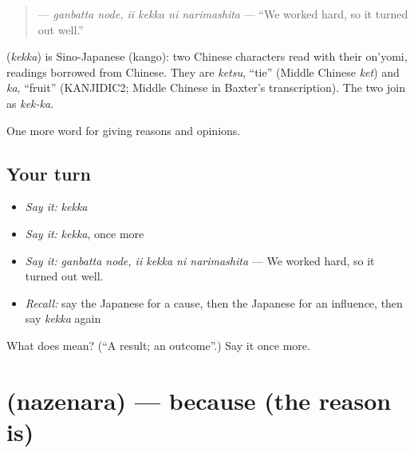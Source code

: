 \begin{quote}
\textbf{  } — \emph{ganbatta node, ii kekka ni narimashita} — \textquotedblleft{}We worked hard, so it turned out well.\textquotedblright{}
\end{quote}

\begin{cousinweb}
\textbf{} (\emph{kekka}) is Sino-Japanese (kango): two Chinese characters read with their on'yomi, readings borrowed from Chinese. They are \emph{ketsu}, \textquotedblleft{}tie\textquotedblright{} (Middle Chinese \emph{ket}) and \emph{ka}, \textquotedblleft{}fruit\textquotedblright{} (KANJIDIC2; Middle Chinese in Baxter's transcription). The two join as \emph{kek-ka}.
\end{cousinweb}

\begin{grammarlens}[title={What you've built}]
One more word for giving reasons and opinions.
\end{grammarlens}

\subsection*{Your turn}
\begin{itemize}
\raggedright
  \item \emph{Say it:} \emph{kekka}
  \item \emph{Say it:} \emph{kekka}, once more
  \item \emph{Say it:} \emph{ganbatta node, ii kekka ni narimashita} — We worked hard, so it turned out well.
  \item \emph{Recall:} say the Japanese for a cause, then the Japanese for an influence, then say \emph{kekka} again
\end{itemize}

\begin{tcolorbox}[breakable,colback=teal!4,colframe=teal!35!black,title={Before you move on}]
What does  mean? (\textquotedblleft{}A result; an outcome\textquotedblright{}.) Say it once more.
\end{tcolorbox}
\section[\texorpdfstring{\ja{なぜなら} (nazenara)}{なぜなら (nazenara)}]{ (nazenara) — because (the reason is)}

\label{lesson:JA-C342-nazenara}



